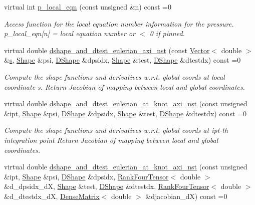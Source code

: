 \begin{DoxyCompactItemize}
\item 
virtual int \hyperlink{classoomph_1_1GeneralisedNewtonianAxisymmetricNavierStokesEquations_a1432210bfed0cd920d1fb1c4d9e73d3f}{p\+\_\+local\+\_\+eqn} (const unsigned \&n) const =0
\begin{DoxyCompactList}\small\item\em Access function for the local equation number information for the pressure. p\+\_\+local\+\_\+eqn\mbox{[}n\mbox{]} = local equation number or $<$ 0 if pinned. \end{DoxyCompactList}\item 
virtual double \hyperlink{classoomph_1_1GeneralisedNewtonianAxisymmetricNavierStokesEquations_a9321e8563cb2dfec9824024008a6914e}{dshape\+\_\+and\+\_\+dtest\+\_\+eulerian\+\_\+axi\+\_\+nst} (const \hyperlink{classoomph_1_1Vector}{Vector}$<$ double $>$ \&\hyperlink{cfortran_8h_ab7123126e4885ef647dd9c6e3807a21c}{s}, \hyperlink{classoomph_1_1Shape}{Shape} \&psi, \hyperlink{classoomph_1_1DShape}{D\+Shape} \&dpsidx, \hyperlink{classoomph_1_1Shape}{Shape} \&test, \hyperlink{classoomph_1_1DShape}{D\+Shape} \&dtestdx) const =0
\begin{DoxyCompactList}\small\item\em Compute the shape functions and derivatives w.\+r.\+t. global coords at local coordinate s. Return Jacobian of mapping between local and global coordinates. \end{DoxyCompactList}\item 
virtual double \hyperlink{classoomph_1_1GeneralisedNewtonianAxisymmetricNavierStokesEquations_aea547f513386ed96746cbf55f70d6f78}{dshape\+\_\+and\+\_\+dtest\+\_\+eulerian\+\_\+at\+\_\+knot\+\_\+axi\+\_\+nst} (const unsigned \&ipt, \hyperlink{classoomph_1_1Shape}{Shape} \&psi, \hyperlink{classoomph_1_1DShape}{D\+Shape} \&dpsidx, \hyperlink{classoomph_1_1Shape}{Shape} \&test, \hyperlink{classoomph_1_1DShape}{D\+Shape} \&dtestdx) const =0
\begin{DoxyCompactList}\small\item\em Compute the shape functions and derivatives w.\+r.\+t. global coords at ipt-\/th integration point Return Jacobian of mapping between local and global coordinates. \end{DoxyCompactList}\item 
virtual double \hyperlink{classoomph_1_1GeneralisedNewtonianAxisymmetricNavierStokesEquations_a768856dbac816acd9b207ed6065bcae7}{dshape\+\_\+and\+\_\+dtest\+\_\+eulerian\+\_\+at\+\_\+knot\+\_\+axi\+\_\+nst} (const unsigned \&ipt, \hyperlink{classoomph_1_1Shape}{Shape} \&psi, \hyperlink{classoomph_1_1DShape}{D\+Shape} \&dpsidx, \hyperlink{classoomph_1_1RankFourTensor}{Rank\+Four\+Tensor}$<$ double $>$ \&d\+\_\+dpsidx\+\_\+dX, \hyperlink{classoomph_1_1Shape}{Shape} \&test, \hyperlink{classoomph_1_1DShape}{D\+Shape} \&dtestdx, \hyperlink{classoomph_1_1RankFourTensor}{Rank\+Four\+Tensor}$<$ double $>$ \&d\+\_\+dtestdx\+\_\+dX, \hyperlink{classoomph_1_1DenseMatrix}{Dense\+Matrix}$<$ double $>$ \&djacobian\+\_\+dX) const =0

\end{DoxyCompactItemize}
